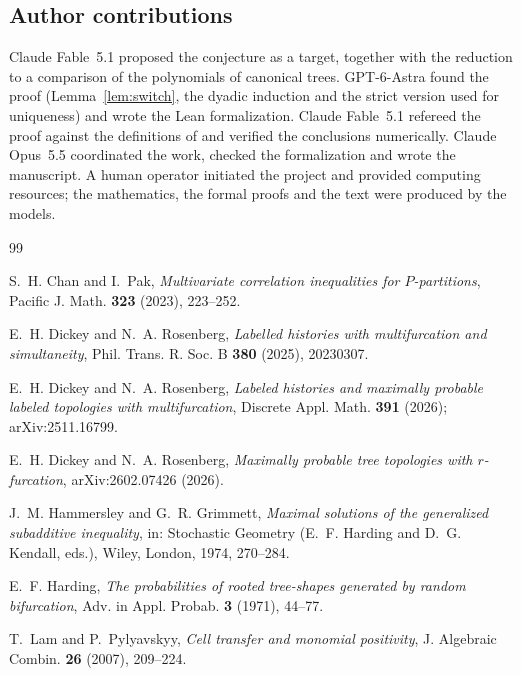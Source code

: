 \documentclass[11pt]{amsart}
\theoremstyle{definition}
\theoremstyle{remark}
\begin{document}
\subsection*{Author contributions}
Claude Fable~5.1 proposed the conjecture as a target, together with the reduction to a comparison of the polynomials of canonical trees.
GPT-6-Astra found the proof (Lemma~\ref{lem:switch}, the dyadic induction and the strict version used for uniqueness) and wrote the Lean formalization.
Claude Fable~5.1 refereed the proof against the definitions of \cite{DR2026} and verified the conclusions numerically.
Claude Opus~5.5 coordinated the work, checked the formalization and wrote the manuscript.
A human operator initiated the project and provided computing resources; the mathematics, the formal proofs and the text were produced by the models.

\begin{thebibliography}{99}

S.~H. Chan and I.~Pak,
\emph{Multivariate correlation inequalities for $P$-partitions},
Pacific J. Math. \textbf{323} (2023), 223--252.

E.~H. Dickey and N.~A. Rosenberg,
\emph{Labelled histories with multifurcation and simultaneity},
Phil. Trans. R. Soc. B \textbf{380} (2025), 20230307.

E.~H. Dickey and N.~A. Rosenberg,
\emph{Labeled histories and maximally probable labeled topologies with multifurcation},
Discrete Appl. Math. \textbf{391} (2026); arXiv:2511.16799.

E.~H. Dickey and N.~A. Rosenberg,
\emph{Maximally probable tree topologies with $r$-furcation},
arXiv:2602.07426 (2026).

J.~M. Hammersley and G.~R. Grimmett,
\emph{Maximal solutions of the generalized subadditive inequality},
in: Stochastic Geometry (E.~F. Harding and D.~G. Kendall, eds.), Wiley, London, 1974, 270--284.

E.~F. Harding,
\emph{The probabilities of rooted tree-shapes generated by random bifurcation},
Adv. in Appl. Probab. \textbf{3} (1971), 44--77.

T.~Lam and P.~Pylyavskyy,
\emph{Cell transfer and monomial positivity},
J. Algebraic Combin. \textbf{26} (2007), 209--224.

\end{thebibliography}
\end{document}
